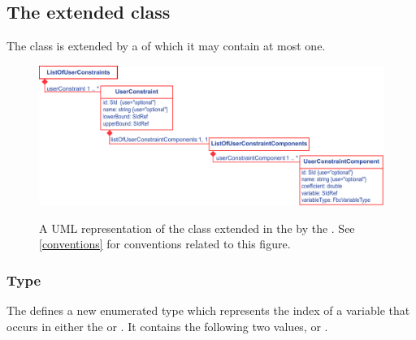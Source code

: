 
\subsection{The extended  class}
\label{model-class-kv}

The \SBML \Model class is extended by a  of which it may contain at most one.
%
\begin{figure}[ht]
  \centering
  \includegraphics[width=\textwidth]{images/fbc_v3_uml_userconstraint.pdf}\\
  \caption{A UML representation of the \SBML \Model class extended in
  the \FBCPackage by the \ListOfUserConstraints. See \ref{conventions} for conventions related to this figure.}
  \label{fig:fbc_v3_uml_user_constraints}
\end{figure}

\subsubsection{Type }
\label{primtype-fbcvariabletype}

The \FBCPackage defines a new enumerated type  which
represents the index of a variable that occurs in either the \FluxObjective or \UserConstraintComponent. It contains the following two values,  or .


%


